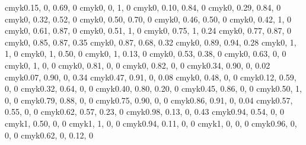 \definecolor{greenyellow}   {cmyk}{0.15, 0, 0.69, 0   }
\definecolor{yellow}        {cmyk}{0, 0, 1, 0}
\definecolor{goldenrod}     {cmyk}{0, 0.10, 0.84, 0   }
\definecolor{dandelion}     {cmyk}{0, 0.29, 0.84, 0   }
\definecolor{apricot}       {cmyk}{0, 0.32, 0.52, 0   }
\definecolor{peach}         {cmyk}{0, 0.50, 0.70, 0   }
\definecolor{melon}         {cmyk}{0, 0.46, 0.50, 0   }
\definecolor{yelloworange}  {cmyk}{0, 0.42, 1, 0   }
\definecolor{orange}        {cmyk}{0, 0.61, 0.87, 0   }
\definecolor{burntorange}   {cmyk}{0, 0.51, 1, 0   }
\definecolor{bittersweet}   {cmyk}{0, 0.75, 1, 0.24}
\definecolor{redorange}     {cmyk}{0, 0.77, 0.87, 0   }
\definecolor{mahogany}      {cmyk}{0, 0.85, 0.87, 0.35}
\definecolor{maroon}        {cmyk}{0, 0.87, 0.68, 0.32}
\definecolor{brickred}      {cmyk}{0, 0.89, 0.94, 0.28}
\definecolor{red}           {cmyk}{0, 1, 1, 0   }
\definecolor{orangered}     {cmyk}{0, 1, 0.50, 0   }
\definecolor{rubinered}     {cmyk}{0, 1, 0.13, 0   }
\definecolor{salmon}        {cmyk}{0, 0.53, 0.38, 0   }
\definecolor{carnationpink} {cmyk}{0, 0.63, 0, 0   }
\definecolor{magenta}       {cmyk}{0, 1, 0, 0   }
\definecolor{violetred}     {cmyk}{0, 0.81, 0, 0   }
\definecolor{rhodamine}     {cmyk}{0, 0.82, 0, 0   }
\definecolor{mulberry}      {cmyk}{0.34, 0.90, 0, 0.02}
\definecolor{redviolet}     {cmyk}{0.07, 0.90, 0, 0.34}
\definecolor{fuchsia}       {cmyk}{0.47, 0.91, 0, 0.08}
\definecolor{lavender}      {cmyk}{0, 0.48, 0, 0   }
\definecolor{thistle}       {cmyk}{0.12, 0.59, 0, 0   }
\definecolor{orchid}        {cmyk}{0.32, 0.64, 0, 0   }
\definecolor{darkorchid}    {cmyk}{0.40, 0.80, 0.20, 0   }
\definecolor{purple}        {cmyk}{0.45, 0.86, 0, 0   }
\definecolor{plum}          {cmyk}{0.50, 1, 0, 0   }
\definecolor{violet}        {cmyk}{0.79, 0.88, 0, 0   }
\definecolor{royalpurple}   {cmyk}{0.75, 0.90, 0, 0   }
\definecolor{blueviolet}    {cmyk}{0.86, 0.91, 0, 0.04}
\definecolor{periwinkle}    {cmyk}{0.57, 0.55, 0, 0   }
\definecolor{cadetblue}     {cmyk}{0.62, 0.57, 0.23, 0   }
\definecolor{midnightblue}  {cmyk}{0.98, 0.13, 0, 0.43}
\definecolor{navyblue}      {cmyk}{0.94, 0.54, 0, 0   }
\definecolor{royalblue}     {cmyk}{1, 0.50, 0, 0   }
\definecolor{blue}          {cmyk}{1, 1, 0, 0   }
\definecolor{cerulean}      {cmyk}{0.94, 0.11, 0, 0   }
\definecolor{cyan}          {cmyk}{1, 0, 0, 0   }
\definecolor{processblue}   {cmyk}{0.96, 0, 0, 0   }
\definecolor{skyblue}       {cmyk}{0.62, 0, 0.12, 0   }

